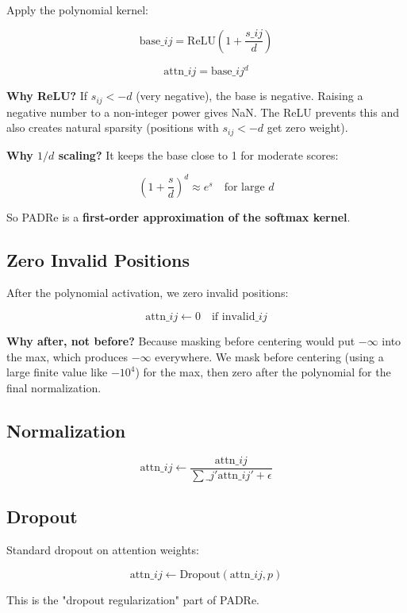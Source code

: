 Apply the polynomial kernel:

\[
\text{base}\_{ij} = \text{ReLU}\!\left(1 + \frac{s\_{ij}}{d}\right)
\tag{4.5}
\]

\[
\text{attn}\_{ij} = \text{base}\_{ij}^d
\tag{4.6}
\]

\textbf{Why ReLU?} If $s_{ij} < -d$ (very negative), the base is negative. Raising 
a negative number to a non-integer power gives NaN. The ReLU prevents this 
and also creates natural sparsity (positions with $s_{ij} < -d$ get zero weight).

\textbf{Why $1/d$ scaling?} It keeps the base close to 1 for moderate scores:

\[
\left(1 + \frac{s}{d}\right)^d \approx e^s \quad \text{for large } d
\tag{4.7}
\]

So PADRe is a \textbf{first-order approximation of the softmax kernel}.

\subsection{Zero Invalid Positions}

After the polynomial activation, we zero invalid positions:

\[
\text{attn}\_{ij} \leftarrow 0 \quad \text{if invalid}\_{ij}
\tag{4.8}
\]

\textbf{Why after, not before?} Because masking before centering would put 
$-\infty$ into the max, which produces $-\infty$ everywhere. We mask 
before centering (using a large finite value like $-10^4$) for the max, 
then zero after the polynomial for the final normalization.

\subsection{Normalization}

\[
\text{attn}\_{ij} \leftarrow \frac{\text{attn}\_{ij}}{\sum\_{j'} \text{attn}\_{ij'} + \epsilon}
\tag{4.9}
\]

\subsection{Dropout}

Standard dropout on attention weights:

\[
\text{attn}\_{ij} \leftarrow \text{Dropout}(\text{attn}\_{ij}, p)
\tag{4.10}
\]

This is the "dropout regularization" part of PADRe.

